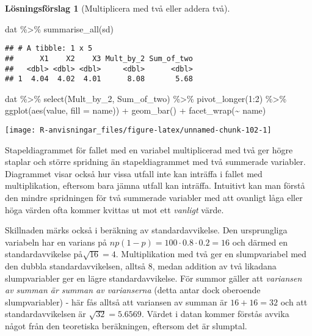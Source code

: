 \documentclass[
]{book}
\newenvironment{Shaded}{\begin{snugshade}}{\end{snugshade}}
\newcommand{\AttributeTok}[1]{\textcolor[rgb]{0.77,0.63,0.00}{#1}}
\newcommand{\DecValTok}[1]{\textcolor[rgb]{0.00,0.00,0.81}{#1}}
\newcommand{\FunctionTok}[1]{\textcolor[rgb]{0.00,0.00,0.00}{#1}}
\newcommand{\NormalTok}[1]{#1}
\newcommand{\SpecialCharTok}[1]{\textcolor[rgb]{0.00,0.00,0.00}{#1}}
\theoremstyle{definition}
\theoremstyle{definition}
\theoremstyle{definition}
\theoremstyle{definition}
\newtheorem{hypothesis}{Lösningsförslag}[chapter]
\theoremstyle{remark}
\begin{document}
\begin{hypothesis}[Multiplicera med två eller addera två]
\begin{Shaded}
\begin{Highlighting}[]
\NormalTok{dat }\SpecialCharTok{\%\textgreater{}\%} 
  \FunctionTok{summarise\_all}\NormalTok{(sd)}
\end{Highlighting}
\end{Shaded}

\begin{verbatim}
## # A tibble: 1 x 5
##      X1    X2    X3 Mult_by_2 Sum_of_two
##   <dbl> <dbl> <dbl>     <dbl>      <dbl>
## 1  4.04  4.02  4.01      8.08       5.68
\end{verbatim}

\begin{Shaded}
\begin{Highlighting}[]
\NormalTok{dat }\SpecialCharTok{\%\textgreater{}\%} 
  \FunctionTok{select}\NormalTok{(Mult\_by\_2, Sum\_of\_two) }\SpecialCharTok{\%\textgreater{}\%} 
  \FunctionTok{pivot\_longer}\NormalTok{(}\DecValTok{1}\SpecialCharTok{:}\DecValTok{2}\NormalTok{) }\SpecialCharTok{\%\textgreater{}\%} 
  \FunctionTok{ggplot}\NormalTok{(}\FunctionTok{aes}\NormalTok{(value, }\AttributeTok{fill =}\NormalTok{ name)) }\SpecialCharTok{+}
  \FunctionTok{geom\_bar}\NormalTok{() }\SpecialCharTok{+}
  \FunctionTok{facet\_wrap}\NormalTok{(}\SpecialCharTok{\textasciitilde{}}\NormalTok{ name)}
\end{Highlighting}
\end{Shaded}

\begin{center}\texttt{[image: R-anvisningar\_files/figure-latex/unnamed-chunk-102-1]} \end{center}

Stapeldiagrammet för fallet med en variabel multiplicerad med två ger högre staplar och större spridning än stapeldiagrammet med två summerade variabler. Diagrammet visar också hur vissa utfall inte kan inträffa i fallet med multiplikation, eftersom bara jämna utfall kan inträffa. Intuitivt kan man förstå den mindre spridningen för två summerade variabler med att ovanligt låga eller höga värden ofta kommer kvittas ut mot ett \emph{vanligt} värde.

Skillnaden märks också i beräkning av standardavvikelse. Den ursprungliga variabeln har en varians på \(np(1-p) = 100 \cdot 0.8 \cdot 0.2 = 16\) och därmed en standardavvikelse på\(\sqrt{16} = 4\). Multiplikation med två ger en slumpvariabel med den dubbla standardavvikelsen, alltså 8, medan addition av två likadana slumpvariabler ger en lägre standardavvikelse. För summor gäller att \emph{variansen av summan är summan av varianserna} (detta antar dock oberoende slumpvariabler) - här fås alltså att variansen av summan är \(16+16=32\) och att standardavvikelsen är \(\sqrt{32} = 5.6569\). Värdet i datan kommer förstås avvika något från den teoretiska beräkningen, eftersom det är slumptal.
\end{hypothesis}
\end{document}
